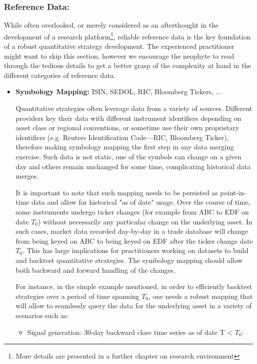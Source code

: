 \subsubsection{Reference Data:} 
While often overlooked, or merely considered as an afterthought in the development of a research platform\footnote{More details are presented in a further chapter on research environment}, reliable reference data is the key foundation of a robust quantitative strategy development. The experienced practitioner might want to skip this section, however we encourage the neophyte to read through the tedious details to get a better grasp of the complexity at hand in the
different categories of reference data.

\begin{itemize}
\item \textbf{Symbology Mapping:} ISIN, SEDOL, RIC, Bloomberg Tickers, ... 

Quantitative strategies often leverage data from a variety of sources. Different providers key their data with different instrument identifiers depending on asset class or regional conventions, or sometime use their own proprietary identifiers (e.g. Reuters Identification Code---RIC, Bloomberg Ticker), therefore making symbology mapping the first step in any data merging exercise. Such data is not static, one of the symbols can change on a given day and others remain unchanged for some time, complicating historical data merges.


It is important to note that such mapping needs to be persisted as point-in-time data and allow for historical "as of date" usage. Over the course of time, some instruments undergo ticker changes (for example from ABC to EDF on date $T_0$) without necessarily any particular change on the underlying asset. In such cases, market data recorded day-by-day in a trade database will change from being keyed on ABC to being keyed on EDF after the ticker change date $T_0$. This has large implications for practitioners working on datasets to build and backtest quantitative strategies. The symbology mapping should allow both backward and forward handling of the changes.


For instance, in the simple example mentioned, in order to efficiently backtest strategies over a period of time spanning $T_0$, one needs a robust mapping that will allow to seamlessly query the data for the underlying asset in a variety of scenarios such as:
\begin{itemize}
\item Signal generation: 30-day backward close time series as of date T < $T_0$:


\end{itemize}
\end{itemize}
